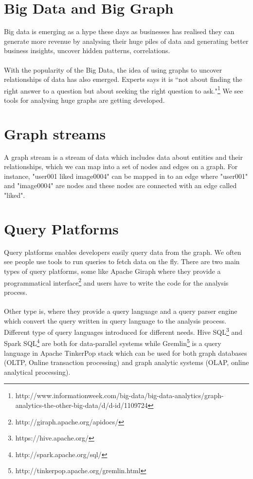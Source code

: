 \documentclass[12pt]{report}
\numberwithin{figure}{section}
\numberwithin{table}{section}
\begin{document}
\section{Big Data and Big Graph}
Big data is emerging as a hype these days as businesses has realised they can generate more revenue by analysing their huge piles of data and generating better business insights,  uncover hidden patterns, correlations. 

\paragraph{}

With the popularity of the Big Data, the idea of using graphs to uncover relationships of data has also emerged. Experts says it is “not about finding the right answer to a question but about seeking the right question to ask."\footnote{http://www.informationweek.com/big-data/big-data-analytics/graph-analytics-the-other-big-data/d/d-id/1109724} We see tools for analysing huge graphs are getting developed.

\section{Graph streams}
A graph stream is a stream of data which includes data about entities and their relationships, which we can map into a set of nodes and edges on a graph. For instance, "user001 liked image0004" can be mapped in to an edge where "user001" and "image0004" are nodes and these nodes are connected with an edge called "liked".

\section{Query Platforms}
Query platforms enables developers easily query data from the graph. We often see people use tools to run queries to fetch data on the fly. There are two main types of query platforms, some like Apache Giraph where they provide a programmatical interface\footnote{http://giraph.apache.org/apidocs/} and users have to write the code for the analysis process. 

\paragraph{}

Other type is, where they provide a query language and a query parser engine which convert the query written in query language to the analysis process. Different type of query languages introduced for different needs. Hive SQL\footnote{https://hive.apache.org/} and Spark SQL\footnote{http://spark.apache.org/sql/} are both for data-parallel systems while Gremlin\footnote{http://tinkerpop.apache.org/gremlin.html} is a query language in Apache TinkerPop stack which can be used for both graph databases (OLTP, Online transaction processing) and graph analytic systems (OLAP, online analytical processing).
\end{document}
